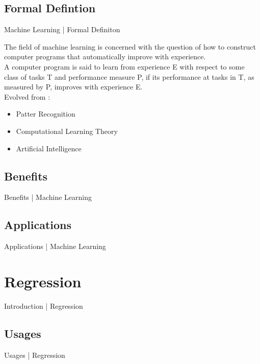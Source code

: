 \documentclass[10pt]{beamer}
\begin{document}
		\subsection{Formal Defintion}
			\begin{frame}{Machine Learning | Formal Definiton}
				\begin{center}
					\small{The field of machine learning is concerned with the question of how to construct computer programs that automatically improve with experience.}\\
					\bigskip
					\large{A computer program is said to learn from experience E with respect to some class of tasks T and performance measure P, if its performance at tasks in T, as measured by P, improves with experience E.}\\
					\bigskip
					\small{Evolved from :}
					\begin{itemize}
						\item {\small Patter Recognition}
						\item {\small Computational Learning Theory}
						\item {\small Artificial Intelligence}
					\end{itemize}
				\end{center}
			\end{frame}
		\subsection{Benefits}
			\begin{frame}{Benefits | Machine Learning}
			\end{frame}
		\subsection{Applications}
			\begin{frame}{Applications | Machine Learning}
			\end{frame}
	
	\section{Regression}
		\begin{frame}{Introduction | Regression}
		\end{frame}
		\subsection{Usages}
			\begin{frame}{Usages | Regression}
			\end{frame}
\end{document}
